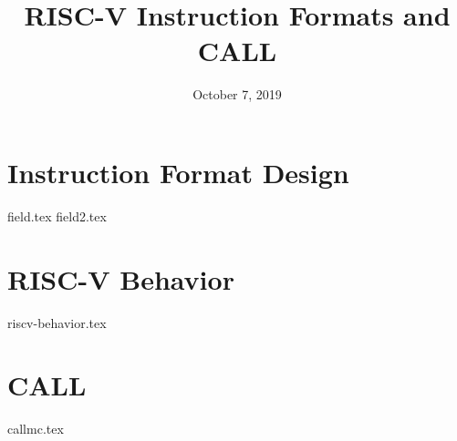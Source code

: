 \documentclass[11pt]{exam}
\title{RISC-V Instruction Formats and CALL}
\date{October 7, 2019}
\begin{document}
\maketitle

\section{Instruction Format Design}
\begin{questions}
{field.tex}
{field2.tex}
\end{questions}
\newpage

\section{RISC-V Behavior}
\begin{questions}
{riscv-behavior.tex}
\end{questions}
\newpage

\section{CALL}
\begin{questions}
{callmc.tex}
\end{questions}
\newpage
\end{document}
